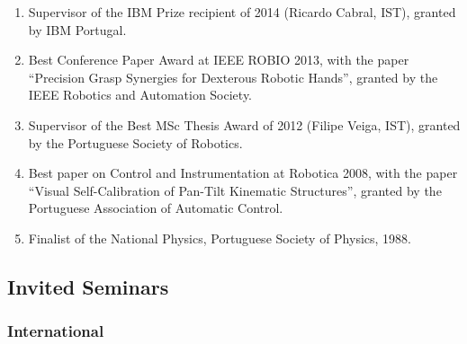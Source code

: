\begin{enumerate}
  Finalist (Top 5 among 85 participants) of the Smart Ageing Prize, AAL
  Programme, AAL Europe -- ICT for Ageing Well, 2018
\item
  Supervisor of the IBM Prize recipient of 2014 (Ricardo Cabral, IST),
  granted by IBM Portugal.
\item
  Best Conference Paper Award at IEEE ROBIO 2013, with the paper
  ``Precision Grasp Synergies for Dexterous Robotic Hands'', granted by
  the IEEE Robotics and Automation Society.
\item
  Supervisor of the Best MSc Thesis Award of 2012 (Filipe Veiga, IST),
  granted by the Portuguese Society of Robotics.
\item
  Best paper on Control and Instrumentation at Robotica 2008, with the
  paper ``Visual Self-Calibration of Pan-Tilt Kinematic Structures'',
  granted by the Portuguese Association of Automatic Control.
\item
  Finalist of the National Physics, Portuguese Society of Physics, 1988.
\end{enumerate}

\subsection{Invited Seminars}\label{invited-seminars}

\subsubsection{International}\label{international}

